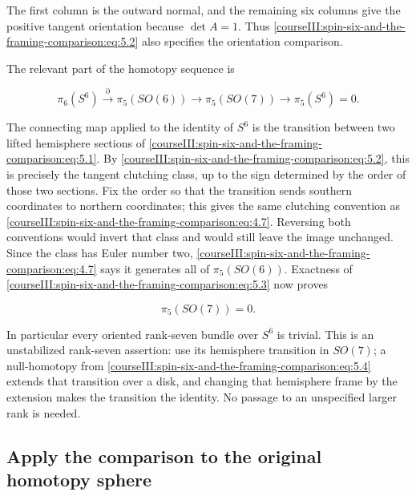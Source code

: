 The first column is the outward normal, and the remaining six columns give the positive tangent orientation because \(\det A=1\). Thus \eqref{courseIII:spin-six-and-the-framing-comparison:eq:5.2} also specifies the orientation comparison.

The relevant part of the homotopy sequence is

\begin{equation}
\pi_6(S^6)\xrightarrow{\partial}\pi_5(SO(6))
\longrightarrow\pi_5(SO(7))
\longrightarrow\pi_5(S^6)=0.
\label{courseIII:spin-six-and-the-framing-comparison:eq:5.3}
\end{equation}

The connecting map applied to the identity of \(S^6\) is the transition between two lifted hemisphere sections of \eqref{courseIII:spin-six-and-the-framing-comparison:eq:5.1}. By \eqref{courseIII:spin-six-and-the-framing-comparison:eq:5.2}, this is precisely the tangent clutching class, up to the sign determined by the order of those two sections. Fix the order so that the transition sends southern coordinates to northern coordinates; this gives the same clutching convention as \eqref{courseIII:spin-six-and-the-framing-comparison:eq:4.7}. Reversing both conventions would invert that class and would still leave the image unchanged. Since the class has Euler number two, \eqref{courseIII:spin-six-and-the-framing-comparison:eq:4.7} says it generates all of \(\pi_5(SO(6))\). Exactness of \eqref{courseIII:spin-six-and-the-framing-comparison:eq:5.3} now proves

\begin{equation}
\pi_5(SO(7))=0.
\label{courseIII:spin-six-and-the-framing-comparison:eq:5.4}
\end{equation}

In particular every oriented rank-seven bundle over \(S^6\) is trivial. This is an unstabilized rank-seven assertion: use its hemisphere transition in \(SO(7)\); a null-homotopy from \eqref{courseIII:spin-six-and-the-framing-comparison:eq:5.4} extends that transition over a disk, and changing that hemisphere frame by the extension makes the transition the identity. No passage to an unspecified larger rank is needed.

\subsection{Apply the comparison to the original homotopy sphere}
\label{courseIII:spin-six-and-the-framing-comparison:framing-original-sphere}

